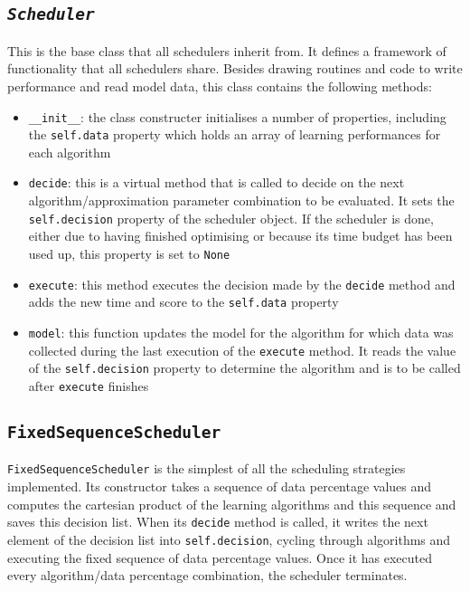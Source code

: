 \documentclass[a4paper,12pt,twoside,openright]{report}
\begin{document}
\subsection{\texttt{\textit{Scheduler}}}
This is the base class that all schedulers inherit from. It defines a framework of functionality that all schedulers share. Besides drawing routines and code to write performance and read model data, this class contains the following methods:

\begin{itemize}
\item \texttt{\_\_init\_\_}: the class constructer initialises a number of properties, including the \texttt{self.data} property which holds an array of learning performances for each algorithm
\item \texttt{decide}: this is a virtual method that is called to decide on the next algorithm/approximation parameter combination to be evaluated. It sets the \texttt{self.decision} property of the scheduler object. If the scheduler is done, either due to having finished optimising or because its time budget has been used up, this property is set to \texttt{None}
\item \texttt{execute}: this method executes the decision made by the \texttt{decide} method and adds the new time and score to the \texttt{self.data} property
\item \texttt{model}: this function updates the model for the algorithm for which data was collected during the last execution of the \texttt{execute} method. It reads the value of the \texttt{self.decision} property to determine the algorithm and is to be called after \texttt{execute} finishes
\end{itemize}


\subsection{\texttt{FixedSequenceScheduler}}
\texttt{FixedSequenceScheduler} is the simplest of all the scheduling strategies implemented. Its constructor takes a sequence of data percentage values and computes the cartesian product of the learning algorithms and this sequence and saves this decision list. When its \texttt{decide} method is called, it writes the next element of the decision list into \texttt{self.decision}, cycling through algorithms and executing the fixed sequence of data percentage values. Once it has executed every algorithm/data percentage combination, the scheduler terminates.
\end{document}
